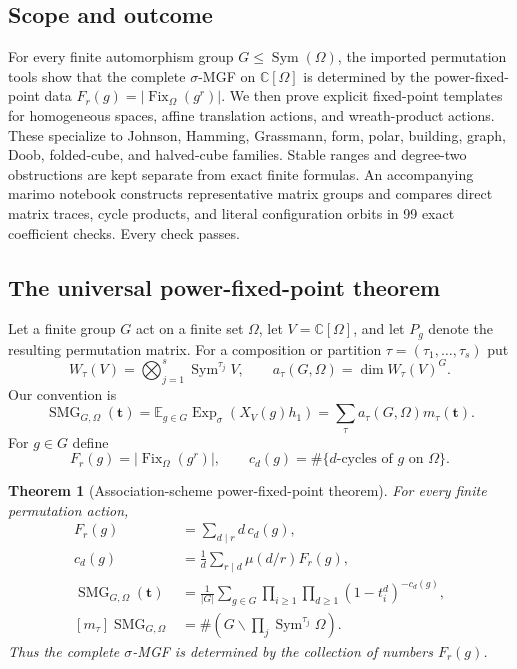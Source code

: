 \documentclass[10pt]{article}
\newcommand{\Sym}{\operatorname{Sym}}
\newcommand{\Fix}{\operatorname{Fix}}
\newcommand{\ExpS}{\operatorname{Exp}_{\sigma}}
\newcommand{\SMG}{\operatorname{SMG}}
\newcommand{\MGF}{\SMG}
\newcommand{\C}{\mathbb C}
\newcommand{\E}{\mathbb E}
\newtheorem{theorem}{Theorem}
\begin{document}
\subsection*{Scope and outcome}

For every finite automorphism group $G\leq\Sym(\Omega)$, the imported
permutation tools show that the complete $\sigma$-MGF on $\C[\Omega]$ is determined by the
power-fixed-point data $F_r(g)=|\Fix_\Omega(g^r)|$.  We then prove explicit
fixed-point templates for homogeneous spaces, affine translation actions, and
wreath-product actions.  These specialize to Johnson, Hamming, Grassmann,
form, polar, building, graph, Doob, folded-cube, and halved-cube families.
Stable ranges and degree-two obstructions are kept separate from exact finite
formulas.  An accompanying marimo notebook constructs representative matrix
groups and compares direct matrix traces, cycle products, and literal
configuration orbits in 99 exact coefficient checks.  Every check passes.

\subsection{The universal power-fixed-point theorem}

Let a finite group $G$ act on a finite set $\Omega$, let $V=\C[\Omega]$, and
let $P_g$ denote the resulting permutation matrix.  For a composition or
partition $\tau=(\tau_1,\ldots,\tau_s)$ put
\[
 W_\tau(V)=\bigotimes_{j=1}^s\Sym^{\tau_j}V,
 \qquad a_\tau(G,\Omega)=\dim W_\tau(V)^G.
\]
Our convention is
\[
 \MGF_{G,\Omega}(\mathbf t)
 =\E_{g\in G}\ExpS(X_V(g)h_1)
 =\sum_\tau a_\tau(G,\Omega)m_\tau(\mathbf t).
\]
For $g\in G$ define
\[
 F_r(g)=|\Fix_\Omega(g^r)|,
 \qquad c_d(g)=\#\{\text{$d$-cycles of $g$ on $\Omega$}\}.
\]

\begin{theorem}[Association-scheme power-fixed-point theorem]
For every finite permutation action,
\begin{align}
 F_r(g)&=\sum_{d\mid r}d\,c_d(g),\label{nd:association_schemes:eq:fixed-from-cycles}\\
 c_d(g)&=\frac1d\sum_{r\mid d}\mu(d/r)F_r(g),\label{nd:association_schemes:eq:mobius}\\
 \MGF_{G,\Omega}(\mathbf t)
 &=\frac1{|G|}\sum_{g\in G}
   \prod_{i\geq1}\prod_{d\geq1}(1-t_i^d)^{-c_d(g)},\label{nd:association_schemes:eq:universal}\\
 [m_\tau]\MGF_{G,\Omega}
 &=\#\left(G\backslash\prod_j\Sym^{\tau_j}\Omega\right).
 \label{nd:association_schemes:eq:orbits}
\end{align}
Thus the complete $\sigma$-MGF is determined by the collection of numbers
$F_r(g)$.
\end{theorem}
\end{document}
